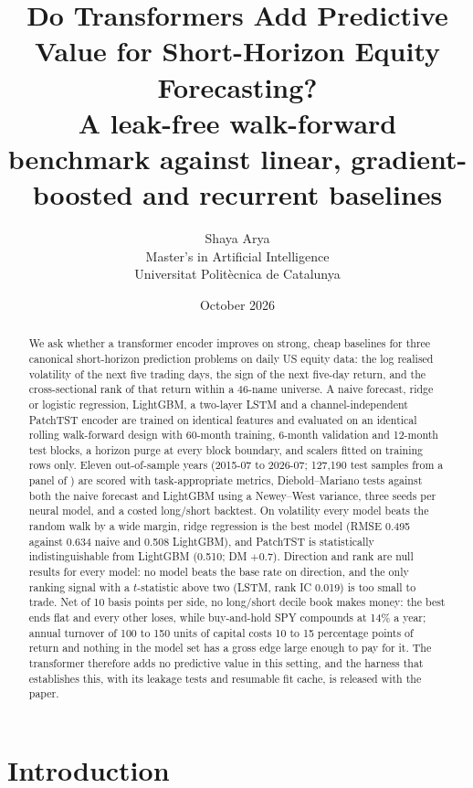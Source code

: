 \documentclass[10pt,a4paper,twoside,twocolumn]{article}
\title{Do Transformers Add Predictive Value for Short-Horizon Equity Forecasting?\\[8pt]
\large A leak-free walk-forward benchmark against linear, gradient-boosted and recurrent baselines}
\author{\large Shaya Arya\\[10pt]
\normalsize Master's in Artificial Intelligence\\[3pt]
\normalsize Universitat Polit\`ecnica de Catalunya}
\date{October 2026}
\begin{document}
\maketitle

\begin{abstract}
We ask whether a transformer encoder improves on strong, cheap baselines for three canonical short-horizon prediction problems on daily US equity data: the log realised volatility of the next five trading days, the sign of the next five-day return, and the cross-sectional rank of that return within a 46-name universe. A naive forecast, ridge or logistic regression, LightGBM, a two-layer LSTM and a channel-independent PatchTST encoder are trained on identical features and evaluated on an identical rolling walk-forward design with 60-month training, 6-month validation and 12-month test blocks, a horizon purge at every block boundary, and scalers fitted on training rows only. Eleven out-of-sample years (2015-07 to 2026-07; 127{,}190 test samples from a panel of \metanrows{}) are scored with task-appropriate metrics, Diebold--Mariano tests against both the naive forecast and LightGBM using a Newey--West variance, three seeds per neural model, and a costed long/short backtest. On volatility every model beats the random walk by a wide margin, ridge regression is the best model (RMSE 0.495 against 0.634 naive and 0.508 LightGBM), and PatchTST is statistically indistinguishable from LightGBM (0.510; DM $+0.7$). Direction and rank are null results for every model: no model beats the base rate on direction, and the only ranking signal with a $t$-statistic above two (LSTM, rank IC 0.019) is too small to trade. Net of 10 basis points per side, no long/short decile book makes money: the best ends flat and every other loses, while buy-and-hold SPY compounds at 14\% a year; annual turnover of 100 to 150 units of capital costs 10 to 15 percentage points of return and nothing in the model set has a gross edge large enough to pay for it. The transformer therefore adds no predictive value in this setting, and the harness that establishes this, with its leakage tests and resumable fit cache, is released with the paper.
\end{abstract}

\section{Introduction}
\end{document}
